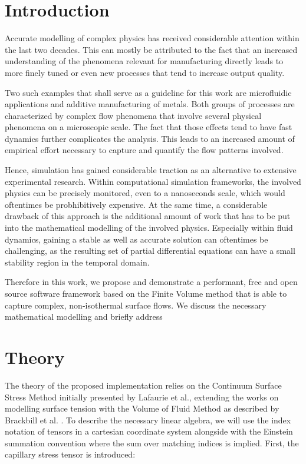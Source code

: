 \documentclass[conference,final]{IEEEtran}
\begin{document}
\section{Introduction}

Accurate modelling of complex physics has received considerable attention within the last two decades.
This can mostly be attributed to the fact that an increased understanding of the phenomena relevant for manufacturing directly leads to more finely tuned or even new processes that tend to increase output quality.

Two such examples that shall serve as a guideline for this work are microfluidic applications and additive manufacturing of metals.
Both groups of processes are characterized by complex flow phenomena that involve several physical phenomena on a microscopic scale. The fact that those effects tend to have fast dynamics further complicates the analysis. This leads to an increased amount of empirical effort necessary to capture and quantify the flow patterns involved.

Hence, simulation has gained considerable traction as an alternative to extensive experimental research. Within computational simulation frameworks, the involved physics can be precisely monitored, even to a nanoseconds scale, which would oftentimes be probhibitively expensive. At the same time, a considerable drawback of this approach is the additional amount of work that has to be put into the mathematical modelling of the involved physics. Especially within fluid dynamics, gaining a stable as well as accurate solution can oftentimes be challenging, as the resulting set of partial differential equations can have a small stability region in the temporal domain.

Therefore in this work, we propose and demonstrate a performant, free and open source software framework based on the Finite Volume method that is able to capture complex, non-isothermal surface flows. We discuss the necessary mathematical modelling and briefly address

\section{Theory}

The theory of the proposed implementation relies on the Continuum Surface Stress Method initially presented by Lafaurie et al., extending the works on modelling surface tension with the Volume of Fluid Method as described by Brackbill et al. \cite{lafaurieModellingMergingFragmentation1994,brackbillContinuumMethodModeling1992}.
To describe the necessary linear algebra, we will use the index notation of tensors in a cartesian coordinate system alongside with the Einstein summation convention where the sum over matching indices is implied. First, the capillary stress tensor is introduced:
\end{document}
